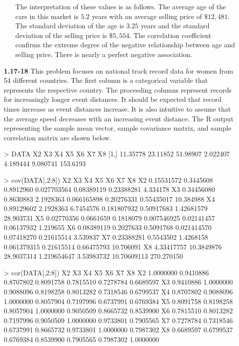 \documentclass[oneside,12pt,letterpaper]{article}
\begin{document}
\begin{enumerate}
\begin{enumerate}
					The interpretation of these values is as follows. The average age of the cars in this market is $5.2$ years with an average selling price of $\$ 12,481$. The standard deviation of the age is $3.25$ years and the standard deviation of the selling price is $\$ 5,554$. The correlation coefficient confirms the extreme degree of the negative relationship between age and selling price. There is nearly a perfect negative association. 

			\end{enumerate}

		\pagebreak
		\item[\textbf{1.17-18}]
			This problem focuses on national track record data for women from 54 different countries. The first column is a categorical variable that represents the respective country. The proceeding columns represent records for increasingly longer event distances. It should be expected that record times increase as event distances increase. It is also intuitive to assume that the average speed decreases with an increasing event distance. The R output representing the sample mean vector, sample covariance matrix, and sample correlation matrix are shown below. \newline
			\begin{rc}
	> DATA %
	  X2       X3       X4       X5       X6       X7       X8
	[1,] 11.35778 23.11852 51.98907 2.022407 4.189444 9.080741 153.6193

	> cov(DATA[,2:8])
	  X2         X3         X4          X5         X6          X7         X8
	X2 0.15531572  0.3445608  0.8912960 0.027703564 0.08389119  0.23388281   4.334178
	X3 0.34456080  0.8630883  2.1928363 0.066165898 0.20276331  0.55435017  10.384988
	X4 0.89129602  2.1928363  6.7454576 0.181807932 0.50917683  1.42681579  28.903731
	X5 0.02770356  0.0661659  0.1818079 0.007546925 0.02141457  0.06137932   1.219655
	X6 0.08389119  0.2027633  0.5091768 0.021414570 0.07418270  0.21615514   3.539837
	X7 0.23388281  0.5543502  1.4268158 0.061379315 0.21615514  0.66475793  10.706091
	X8 4.33417757 10.3849876 28.9037314 1.219654647 3.53983732 10.70609113 270.270150

	> cor(DATA[,2:8])
	  X2        X3        X4        X5        X6        X7        X8
	X2 1.0000000 0.9410886 0.8707802 0.8091758 0.7815510 0.7278784 0.6689597
	X3 0.9410886 1.0000000 0.9088096 0.8198258 0.8013282 0.7318546 0.6799537
	X4 0.8707802 0.9088096 1.0000000 0.8057904 0.7197996 0.6737991 0.6769384
	X5 0.8091758 0.8198258 0.8057904 1.0000000 0.9050509 0.8665732 0.8539900
	X6 0.7815510 0.8013282 0.7197996 0.9050509 1.0000000 0.9733801 0.7905565
	X7 0.7278784 0.7318546 0.6737991 0.8665732 0.9733801 1.0000000 0.7987302
	X8 0.6689597 0.6799537 0.6769384 0.8539900 0.7905565 0.7987302 1.0000000


\end{rc}
\end{enumerate}
\end{document}

